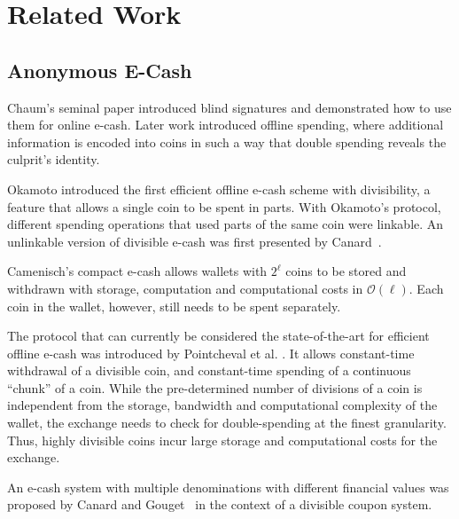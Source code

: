 \section{Related Work}

\subsection{Anonymous E-Cash}\label{sec:related-work:e-cash}

Chaum's seminal paper \cite{chaum1983blind} introduced blind signatures and
demonstrated how to use them for online e-cash.  Later work
\cite{chaum1989efficient,chaum1990untraceable} introduced offline spending, where additional
information is encoded into coins in such a way that double spending reveals
the culprit's identity.

Okamoto \cite{okamoto1995efficient} introduced the first efficient offline
e-cash scheme with divisibility, a feature that allows a single coin to be
spent in parts.  With Okamoto's protocol, different spending operations that
used parts of the same coin were linkable.  An unlinkable version of
divisible e-cash was first presented by Canard~\cite{canard2007divisible}.

Camenisch's compact e-cash \cite{camenisch2005compact} allows wallets with $2^\ell$ coins to be stored
and withdrawn with storage, computation and computational costs in $\mathcal{O}(\ell)$.
Each coin in the wallet, however, still needs to be spent separately.

The protocol that can currently be considered the state-of-the-art for efficient
offline e-cash was introduced by Pointcheval et al. \cite{pointcheval2017cut}.
It allows constant-time withdrawal of a divisible coin, and constant-time
spending of a continuous ``chunk'' of a coin.  While the pre-determined number
of divisions of a coin is independent from the storage, bandwidth and
computational complexity of the wallet, the exchange needs to check for
double-spending at the finest granularity.  Thus, highly divisible coins incur
large storage and computational costs for the exchange.

An e-cash system with multiple denominations with different financial values
was proposed by Canard and Gouget~\cite{canard2006handy} in the context of a divisible
coupon system.

